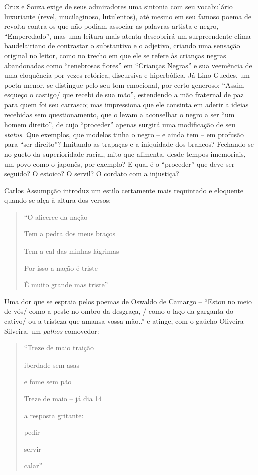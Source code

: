 \documentclass[
  letterpaper,
  DIV=11,
  numbers=noendperiod]{scrreprt}
\begin{document}
Cruz e Souza exige de seus admiradores uma sintonia com seu vocabulário
luxuriante (revel, mucilaginoso, lutulentos), até mesmo em seu famoso
poema de revolta contra os que não podiam associar as palavras artista e
negro, ``Emperedado'', mas uma leitura mais atenta descobrirá um
surpreendente clima baudelairiano de contrastar o substantivo e o
adjetivo, criando uma sensação original no leitor, como no trecho em que
ele se refere às crianças negras abandonadas como ``tenebrosas flores''
em ``Crianças Negras'' e sua veemência de uma eloquência por vezes
retórica, discursiva e hiperbólica. Já Lino Guedes, um poeta menor, se
distingue pelo seu tom emocional, por certo generoso: ``Assim esqueço o
castigo/ que recebi de sua mão'', estendendo a mão fraternal de paz para
quem foi seu carrasco; mas impressiona que ele consinta em aderir a
ideias recebidas sem questionamento, que o levam a aconselhar o negro a
ser ``um homem direito'', de cujo ``proceder'' apenas surgirá uma
modificação de seu \emph{status}. Que exemplos, que modelos tinha o
negro -- e ainda tem -- em profusão para ``ser direito''? Imitando as
trapaças e a iniquidade dos brancos? Fechando-se no gueto da
superioridade racial, mito que alimenta, desde tempos imemoriais, um
povo como o japonês, por exemplo? E qual é o ``proceder'' que deve ser
seguido? O estoico? O servil? O cordato com a injustiça?

Carlos Assumpção introduz um estilo certamente mais requintado e
eloquente quando se alça à altura dos versos:

\begin{quote}
``O alicerce da nação~

Tem a pedra dos meus braços~

Tem a cal das minhas lágrimas~

Por isso a nação é triste~

É muito grande mas triste''
\end{quote}

Uma dor que se espraia pelos poemas de Oswaldo de Camargo -- ``Estou no
meio de vós/ como a peste no ombro da desgraça, / como o laço da
garganta do cativo/ ou a tristeza que amansa vossa mão..'' e atinge, com
o gaúcho Oliveira Silveira, um \emph{pathos} comovedor:

\begin{quote}
``Treze de maio traição~

iberdade sem asas~

e fome sem pão~

Treze de maio -- já dia 14~

a resposta gritante:~

pedir~

servir~

calar''
\end{quote}
\end{document}

